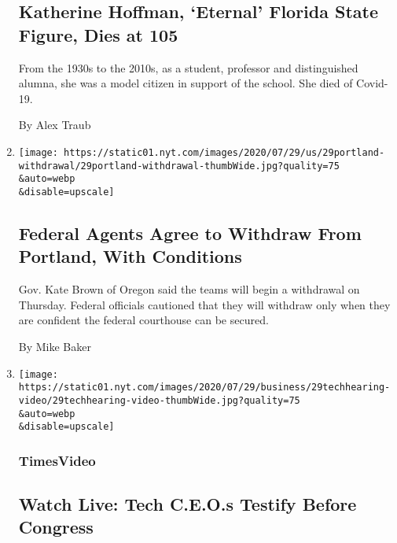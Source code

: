 \begin{enumerate}
  \hypertarget{katherine-hoffman-eternal-florida-state-figure-dies-at-105}{%
  \subsection{Katherine Hoffman, `Eternal' Florida State Figure, Dies at
  105}\label{katherine-hoffman-eternal-florida-state-figure-dies-at-105}}

  From the 1930s to the 2010s, as a student, professor and distinguished
  alumna, she was a model citizen in support of the school. She died of
  Covid-19.

  By Alex Traub
\item
  \href{/2020/07/29/us/protests-portland-federal-withdrawal.html}{}

  \texttt{[image: https://static01.nyt.com/images/2020/07/29/us/29portland-withdrawal/29portland-withdrawal-thumbWide.jpg?quality=75\\\&auto=webp\\\&disable=upscale]}

  \hypertarget{federal-agents-agree-to-withdraw-from-portland-with-conditions-1}{%
  \subsection{Federal Agents Agree to Withdraw From Portland, With
  Conditions}\label{federal-agents-agree-to-withdraw-from-portland-with-conditions-1}}

  Gov. Kate Brown of Oregon said the teams will begin a withdrawal on
  Thursday. Federal officials cautioned that they will withdraw only
  when they are confident the federal courthouse can be secured.

  By Mike Baker
\item
  \href{/video/us/politics/100000007262236/congress-tech-antitrust-hearings-live.html}{}

  \texttt{[image: https://static01.nyt.com/images/2020/07/29/business/29techhearing-video/29techhearing-video-thumbWide.jpg?quality=75\\\&auto=webp\\\&disable=upscale]}

  \hypertarget{timesvideo-2}{%
  \subsubsection{TimesVideo}\label{timesvideo-2}}

  \hypertarget{watch-live-tech-ceos-testify-before-congress}{%
  \subsection{Watch Live: Tech C.E.O.s Testify Before
  Congress}\label{watch-live-tech-ceos-testify-before-congress}}


\end{enumerate}
